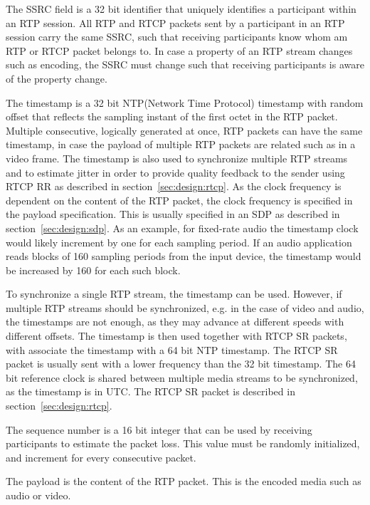 The \ac{SSRC} field is a 32 bit identifier that uniquely identifies a participant within an RTP session. All RTP and RTCP packets sent by a participant in an RTP session carry the same SSRC, such that receiving participants know whom am RTP or RTCP packet belongs to. In case a property of an RTP stream changes such as encoding, the SSRC must change such that receiving participants is aware of the property change.

The timestamp is a 32 bit NTP(Network Time Protocol) timestamp with random offset that reflects the sampling instant of the first octet in the RTP packet. Multiple consecutive, logically generated at once, RTP packets can have the same timestamp, in case the payload of multiple RTP packets are related such as in a video frame.
The timestamp is also used to synchronize multiple RTP streams and to estimate jitter in order to provide quality feedback to the sender using RTCP RR as described in section~\ref{sec:design:rtcp}.
As the clock frequency is dependent on the content of the RTP packet, the clock frequency is specified in the payload specification. This is usually specified in an SDP as described in section~\ref{sec:design:sdp}. As an example, for fixed-rate audio the timestamp clock would likely increment by one for each sampling period. If an audio application reads blocks of 160 sampling periods from the input device, the timestamp would be increased by 160 for each such block\citep{RFC3550}.

To synchronize a single RTP stream, the timestamp can be used. However, if multiple RTP streams should be synchronized, e.g. in the case of video and audio, the timestamps are not enough, as they may advance at different speeds with different offsets. The timestamp is then used together with RTCP SR packets, with associate the timestamp with a 64 bit NTP timestamp. The RTCP SR packet is usually sent with a lower frequency than the 32 bit timestamp. The 64 bit reference clock is shared between multiple media streams to be synchronized, as the timestamp is in \ac{UTC}. The RTCP SR packet is described in section~\ref{sec:design:rtcp}.


The sequence number is a 16 bit integer that can be used by receiving participants to estimate the packet loss. This value must be randomly initialized, and increment for every consecutive packet.

The payload is the content of the RTP packet. This is the encoded media such as audio or video. 

